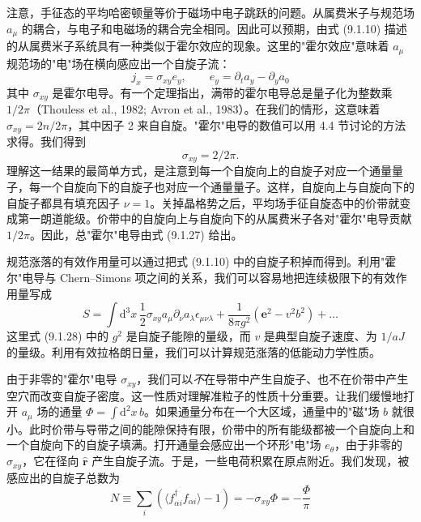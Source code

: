 注意，手征态的平均哈密顿量等价于磁场中电子跳跃的问题。从属费米子与规范场 $a_{\mu}$ 的耦合，与电子和电磁场的耦合完全相同。因此可以预期，由式 (9.1.10) 描述的从属费米子系统具有一种类似于霍尔效应的现象。这里的"霍尔效应"意味着 $a_{\mu}$ 规范场的"电"场在横向感应出一个自旋子流：
\begin{equation*}
j_x=\sigma_{xy}e_y,\qquad e_y=\partial_ta_y-\partial_ya_0
\tag{9.1.26}
\end{equation*}
其中 $\sigma_{xy}$ 是霍尔电导。有一个定理指出，满带的霍尔电导总是量子化为整数乘 $1/2\pi$（Thouless et al., 1982; Avron et al., 1983）。在我们的情形，这意味着 $\sigma_{xy}=2n/2\pi$，其中因子 2 来自自旋。"霍尔"电导的数值可以用 4.4 节讨论的方法求得。我们得到
\begin{equation*}
\sigma_{xy}=2/2\pi.
\tag{9.1.27}
\end{equation*}
理解这一结果的最简单方式，是注意到每一个自旋向上的自旋子对应一个通量量子，每一个自旋向下的自旋子也对应一个通量量子。这样，自旋向上与自旋向下的自旋子都具有填充因子 $\nu=1$。关掉晶格势之后，平均场手征自旋态中的价带就变成第一朗道能级。价带中的自旋向上与自旋向下的从属费米子各对"霍尔"电导贡献 $1/2\pi$。因此，总"霍尔"电导由式 (9.1.27) 给出。

规范涨落的有效作用量可以通过把式 (9.1.10) 中的自旋子积掉而得到。利用"霍尔"电导与 Chern--Simons 项之间的关系，我们可以容易地把连续极限下的有效作用量写成
\begin{equation*}
S=\int\mathrm{d}^3x\,\frac{1}{2}\sigma_{xy}a_{\mu}\partial_{\nu}a_{\lambda}\epsilon_{\mu\nu\lambda}+\frac{1}{8\pi g^2}(\mathbf{e}^2-v^2b^2)+\dots
\tag{9.1.28}
\end{equation*}
这里式 (9.1.28) 中的 $g^2$ 是自旋子能隙的量级，而 $v$ 是典型自旋子速度、为 $1/aJ$ 的量级。利用有效拉格朗日量，我们可以计算规范涨落的低能动力学性质。

由于非零的"霍尔"电导 $\sigma_{xy}$，我们可以\emph{不}在导带中产生自旋子、也不在价带中产生空穴而改变自旋子密度。这一性质对理解准粒子的性质十分重要。让我们缓慢地打开 $a_{\mu}$ 场的通量 $\Phi=\int\mathrm{d}^2x\,b$。如果通量分布在一个大区域，通量中的"磁"场 $b$ 就很小。此时价带与导带之间的能隙保持有限，价带中的所有能级都被一个自旋向上和一个自旋向下的自旋子填满。打开通量会感应出一个环形"电"场 $e_{\theta}$，由于非零的 $\sigma_{xy}$，它在径向 $\hat{\pmb{r}}$ 产生自旋子流。于是，一些电荷积累在原点附近。我们发现，被感应出的自旋子总数为
\begin{equation*}
N\equiv\sum_i(\langle f^{\dagger}_{\alpha i}f_{\alpha i}\rangle-1)=-\sigma_{xy}\Phi=-\frac{\Phi}{\pi}
\tag{9.1.29}
\end{equation*}

